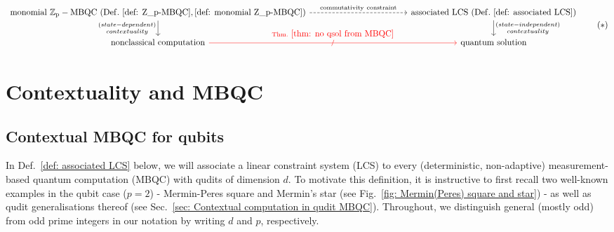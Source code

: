 \documentclass[aps,pra,letterpaper,onrcolumn,nofootinbib,notitlepage,longbibliography]{revtex4-1}
\newcommand{\zz}{\mathbb Z}
\begin{document}
\begin{equation}\label{eq: mismatch state-(in)dep contextuality}
    \begin{tikzcd}[column sep=4cm]
        \mathrm{monomial\ \zz_p-MBQC\ (Def.~\ref{def: Z_p-MBQC},\ref{def: monomial Z_p-MBQC})} \arrow[rightarrow]{d}[swap]{\substack{(state-dependent)\\ contextuality}}
        \arrow[rightarrow,dashed]{r}{\mathrm{commutativity\ constraint}}
        & \mathrm{associated\ LCS\ (Def.~\ref{def: associated LCS})}
        \arrow[rightarrow]{d}{\substack{(state-independent)\\ contextuality}} \\
        \mathrm{nonclassical\ computation} 
        \arrow[rightarrow,"/"{anchor=center,sloped},red]{r}[yshift=0.1cm]{\mathrm{Thm.~}\ref{thm: no qsol from MBQC}}
        &\mathrm{quantum\ solution}
    \end{tikzcd}\tag{$*$}
\end{equation}


\section{Contextuality and MBQC}\label{sec: MBQC and LCS}

\subsection{Contextual MBQC for qubits}\label{sec: contextual MBQC for qubits}

In Def.~\ref{def: associated LCS} below, we will associate a linear constraint system (LCS) to every (deterministic, non-adaptive) measurement-based quantum computation (MBQC) with qudits of dimension $d$. To motivate this definition, it is instructive to first recall two well-known examples in the qubit case ($p=2$) - Mermin-Peres square and Mermin's star (see Fig.~\ref{fig: Mermin(Peres) square and star}) - as well as qudit generalisations thereof (see Sec.~\ref{sec: Contextual computation in qudit MBQC}). Throughout, we distinguish general (mostly odd) from odd prime integers in our notation by writing $d$ and $p$, respectively.\\
\end{document}

